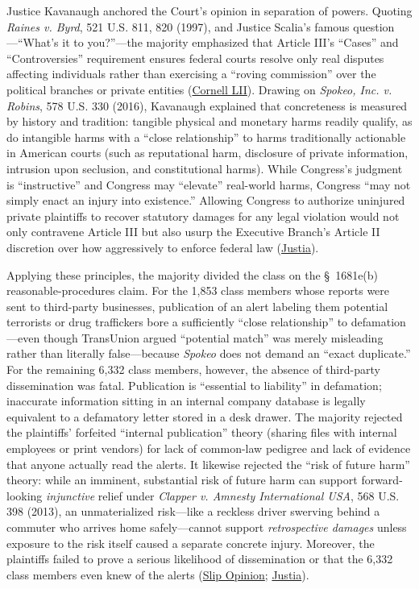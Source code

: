 \documentclass[12pt]{article}
\begin{document}
Justice Kavanaugh anchored the Court's opinion in separation of powers. Quoting \textit{Raines v. Byrd}, 521 U.S. 811, 820 (1997), and Justice Scalia's famous question---``What's it to you?''---the majority emphasized that Article III's ``Cases'' and ``Controversies'' requirement ensures federal courts resolve only real disputes affecting individuals rather than exercising a ``roving commission'' over the political branches or private entities (\href{https://www.law.cornell.edu/supremecourt/text/20-297}{Cornell LII}). Drawing on \textit{Spokeo, Inc. v. Robins}, 578 U.S. 330 (2016), Kavanaugh explained that concreteness is measured by history and tradition: tangible physical and monetary harms readily qualify, as do intangible harms with a ``close relationship'' to harms traditionally actionable in American courts (such as reputational harm, disclosure of private information, intrusion upon seclusion, and constitutional harms). While Congress's judgment is ``instructive'' and Congress may ``elevate'' real-world harms, Congress ``may not simply enact an injury into existence.'' Allowing Congress to authorize uninjured private plaintiffs to recover statutory damages for any legal violation would not only contravene Article III but also usurp the Executive Branch's Article II discretion over how aggressively to enforce federal law (\href{https://supreme.justia.com/cases/federal/us/594/20-297/}{Justia}).

Applying these principles, the majority divided the class on the \S~1681e(b) reasonable-procedures claim. For the 1,853 class members whose reports were sent to third-party businesses, publication of an alert labeling them potential terrorists or drug traffickers bore a sufficiently ``close relationship'' to defamation---even though TransUnion argued ``potential match'' was merely misleading rather than literally false---because \textit{Spokeo} does not demand an ``exact duplicate.'' For the remaining 6,332 class members, however, the absence of third-party dissemination was fatal. Publication is ``essential to liability'' in defamation; inaccurate information sitting in an internal company database is legally equivalent to a defamatory letter stored in a desk drawer. The majority rejected the plaintiffs' forfeited ``internal publication'' theory (sharing files with internal employees or print vendors) for lack of common-law pedigree and lack of evidence that anyone actually read the alerts. It likewise rejected the ``risk of future harm'' theory: while an imminent, substantial risk of future harm can support forward-looking \textit{injunctive} relief under \textit{Clapper v. Amnesty International USA}, 568 U.S. 398 (2013), an unmaterialized risk---like a reckless driver swerving behind a commuter who arrives home safely---cannot support \textit{retrospective damages} unless exposure to the risk itself caused a separate concrete injury. Moreover, the plaintiffs failed to prove a serious likelihood of dissemination or that the 6,332 class members even knew of the alerts (\href{https://www.supremecourt.gov/opinions/20pdf/20-297_4g25.pdf}{Slip Opinion}; \href{https://supreme.justia.com/cases/federal/us/594/20-297/}{Justia}).
\end{document}
